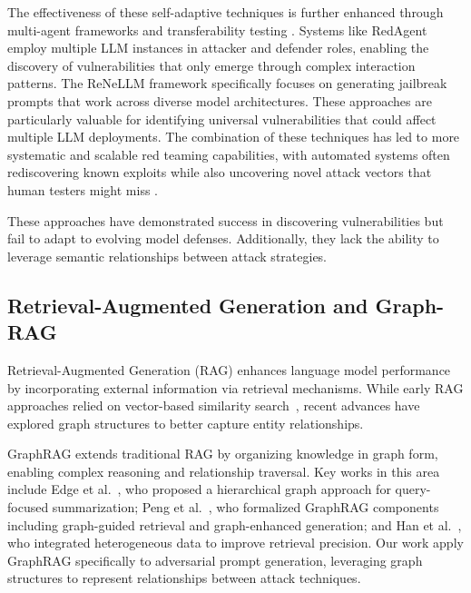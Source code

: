     The effectiveness of these self-adaptive techniques is further enhanced through multi-agent frameworks and transferability testing \citep{RedTeamSurvey2024}. Systems like RedAgent employ multiple LLM instances in attacker and defender roles, enabling the discovery of vulnerabilities that only emerge through complex interaction patterns. The ReNeLLM framework specifically focuses on generating jailbreak prompts that work across diverse model architectures. These approaches are particularly valuable for identifying universal vulnerabilities that could affect multiple LLM deployments. The combination of these techniques has led to more systematic and scalable red teaming capabilities, with automated systems often rediscovering known exploits while also uncovering novel attack vectors that human testers might miss \citep{RedTeamSurvey2024}.

These approaches have demonstrated success in discovering vulnerabilities but fail to adapt to evolving model defenses. Additionally, they lack the ability to leverage semantic relationships between attack strategies.

\subsection{Retrieval-Augmented Generation and Graph-RAG}

Retrieval-Augmented Generation (RAG) enhances language model performance by incorporating external information via retrieval mechanisms. While early RAG approaches relied on vector-based similarity search~\cite{lewis2020retrieval}, recent advances have explored graph structures to better capture entity relationships.

GraphRAG extends traditional RAG by organizing knowledge in graph form, enabling complex reasoning and relationship traversal. Key works in this area include Edge et al.~\cite{edge2024local}, who proposed a hierarchical graph approach for query-focused summarization; Peng et al.~\cite{peng2024graph}, who formalized GraphRAG components including graph-guided retrieval and graph-enhanced generation; and Han et al.~\cite{han2024retrieval}, who integrated heterogeneous data to improve retrieval precision. Our work apply GraphRAG specifically to adversarial prompt generation, leveraging graph structures to represent relationships between attack techniques.
